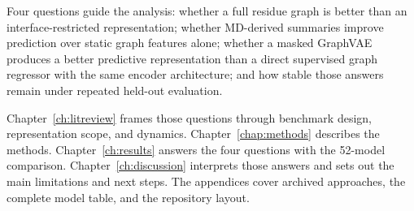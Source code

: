 Four questions guide the analysis: whether a full residue graph is better than an interface-restricted representation; whether MD-derived summaries improve prediction over static graph features alone; whether a masked GraphVAE produces a better predictive representation than a direct supervised graph regressor with the same encoder architecture; and how stable those answers remain under repeated held-out evaluation.

Chapter~\ref{ch:litreview} frames those questions through benchmark design, representation scope, and dynamics. Chapter~\ref{chap:methods} describes the methods. Chapter~\ref{ch:results} answers the four questions with the 52-model comparison. Chapter~\ref{ch:discussion} interprets those answers and sets out the main limitations and next steps. The appendices cover archived approaches, the complete model table, and the repository layout.
